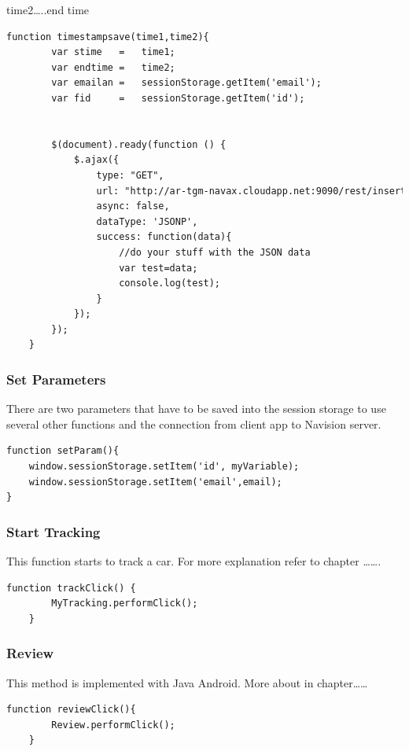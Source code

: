 time2…..end time
\\
\begin{lstlisting}[language=html, caption= 
start timer function,captionpos=b]
function timestampsave(time1,time2){
        var stime	= 	time1;
        var endtime	=	time2;
        var emailan = 	sessionStorage.getItem('email');
        var fid 	= 	sessionStorage.getItem('id');
        

        $(document).ready(function () {
            $.ajax({
                type: "GET",
                url: "http://ar-tgm-navax.cloudapp.net:9090/rest/insertTrackingHistory/"+emailan+"/"+fid+"/"+stime+"/"+endtime+"/ac73f229f1fb88a8719e5f6d295bee45?callback=?",
                async: false,
                dataType: 'JSONP',
                success: function(data){
                    //do your stuff with the JSON data
                    var test=data;
                    console.log(test);
                }
            });
        });
    }
\end{lstlisting}


\subsubsection{Set Parameters}
There are two parameters that have to be saved into the session storage to use several other functions and the connection from client app to Navision server.
\\
\begin{lstlisting}[language=html, caption= 
start timer function,captionpos=b]
function setParam(){
	window.sessionStorage.setItem('id', myVariable);
	window.sessionStorage.setItem('email',email);
}
\end{lstlisting}




\subsubsection{Start Tracking}
This function starts to track a car. For more explanation refer to chapter …….
\\

\begin{lstlisting}[language=html, caption= 
start timer function,captionpos=b]
function trackClick() {
        MyTracking.performClick();
    }
\end{lstlisting}

\subsubsection{Review}
This method is implemented with Java Android. More about in chapter……
\\
\begin{lstlisting}[language=html, caption= 
start timer function,captionpos=b]
function reviewClick(){
        Review.performClick();
    }
\end{lstlisting}


